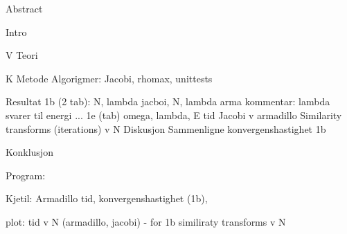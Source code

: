 

		Abstract

		Intro
		
V		Teori
						
			
K		Metode
			Algorigmer: Jacobi, rhomax, unittests
			
		Resultat
			1b (2 tab): N, lambda jacboi,
							  N, lambda arma
					kommentar: lambda svarer til energi ... 
			1e	 (tab) omega, lambda, E
			tid
			Jacobi v armadillo
			Similarity transforms (iterations) v N
		Diskusjon
			Sammenligne konvergenshastighet  1b
			
		Konklusjon
		
		

Program:

	Kjetil: Armadillo tid, konvergenshastighet (1b),
	
	plot: tid v N (armadillo, jacobi) - for 1b
	similiraty transforms v N
	
	